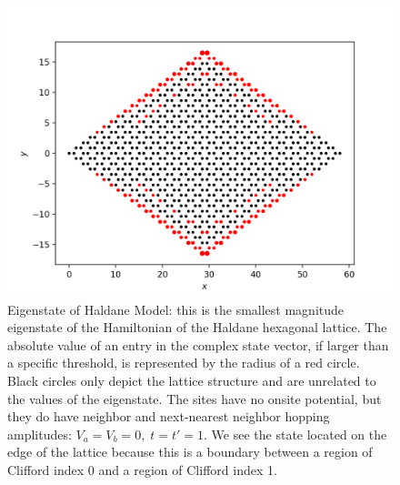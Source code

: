 \documentclass[a4paper]{article}
\begin{document}
\begin{figure}
\centering
\includegraphics[width=.5\textwidth]{figures/haldane_estate.png}
\caption{Eigenstate of Haldane Model: this is the smallest magnitude eigenstate of the Hamiltonian of the Haldane hexagonal lattice.
The absolute value of an entry in the complex state vector, if larger than a specific threshold, is represented by the radius of a red circle.
Black circles only depict the lattice structure and are unrelated to the values of the eigenstate.
The sites have no onsite potential, but they do have neighbor and next-nearest neighbor hopping amplitudes: $V_a = V_b = 0,\; t = t' = 1$.
We see the state located on the edge of the lattice because this is a boundary between a region of Clifford index 0 and a region of Clifford index 1.
}
\label{fig:haldane_estate}%
\end{figure}
\end{document}
